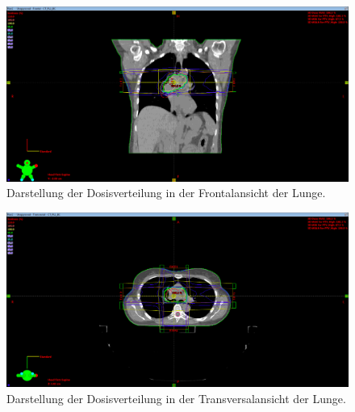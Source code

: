 \begin{figure}[H]
	\centering
	\includegraphics[width=\linewidth]{Bilder/Lunge2_Y}
	\caption{Darstellung der Dosisverteilung in der Frontalansicht der Lunge.}
	\label{fig:lunge2y}
\end{figure}

\begin{figure}[H]
	\centering
	\includegraphics[width=\linewidth]{Bilder/Lunge2_Z}
	\caption{Darstellung der Dosisverteilung in der Transversalansicht der Lunge.}
	\label{fig:lunge2z}
\end{figure}



